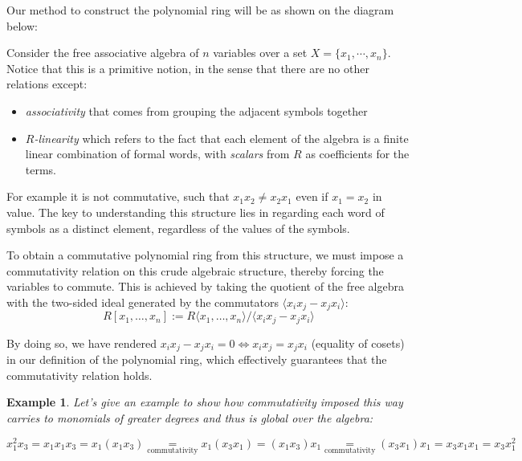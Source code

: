 \documentclass[12pt]{article}
\newtheorem{example}[theorem]{Example}
\numberwithin{theorem}{section}
\numberwithin{equation}{theorem}
\begin{document}
Our method to construct the polynomial ring will be as shown on the diagram below:

\begin{center}
\begin{minipage}{\textwidth}
\centering
{}
\end{minipage}
\end{center}

Consider the free associative algebra of $n$ variables over a set $X = \{x_1, \cdots, x_n\}$.
Notice that this is a primitive notion, in the sense that there are no other relations except:
\begin{itemize}
    \item \emph{associativity} that comes from grouping the adjacent symbols together
    \item \emph{$R$-linearity} which refers to the fact that each element of the algebra is a finite linear combination of formal words, with \emph{scalars} from $R$ as coefficients for the terms.
\end{itemize}
For example it is not commutative, such that $x_1x_2 \neq x_2x_1$ even if $x_1 = x_2$ in value. The key to understanding this structure lies in regarding each word of symbols as a distinct element, regardless of the values of the symbols.

To obtain a commutative polynomial ring from this structure, we must impose a commutativity relation on this crude algebraic structure, thereby forcing the variables to commute. This is achieved by taking the quotient of the free algebra with the two-sided ideal generated by the commutators $\langle x_ix_j - x_jx_i \rangle$:
$$R[x_1, \dots, x_n] := R\langle x_1, \dots, x_n \rangle \big/ \langle x_ix_j - x_jx_i \rangle$$

By doing so, we have rendered $x_ix_j - x_jx_i = 0 \Longleftrightarrow x_ix_j = x_jx_i$ (equality of cosets) in our definition of the polynomial ring, which effectively guarantees that the commutativity relation holds. 

\begin{example}
Let's give an example to show how commutativity imposed this way carries to monomials of greater degrees and thus is global over the algebra:

\begin{equation*}
    x_1^2x_3 = x_1x_1x_3 = x_1(x_1x_3) \underset{\mathrm{commutativity}}{=} x_1(x_3x_1) = (x_1x_3)x_1 \underset{\mathrm{commutativity}}{=} (x_3x_1)x_1 = x_3x_1x_1 = x_3x_1^2
\end{equation*}
\end{example}
\end{document}
